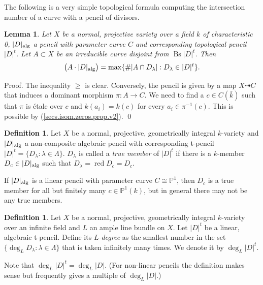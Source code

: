 \documentclass{amsart}
\newtheorem{lem}[thm]{Lemma}
\theoremstyle{definition}
\newtheorem{defn}[thm]{Definition}
\theoremstyle{remark}
\newcommand{\p}[0]{{\mathbb P}}
\newcommand{\map}[0]{\dasharrow}
\newcommand{\red}[0]{\operatorname{red}}
\newcommand{\bs}[0]{\operatorname{Bs}}
\begin{document}
\medskip

The following is a very simple topological formula computing the intersection number of a curve with a  pencil of divisors.


\begin{lem}\label{int.number.curve.pencil}
  Let  $X$ be a normal, projective variety over a  field $k$ of characteristic 0,  $|D|_{\rm alg}$  a pencil with parameter curve $C$ and corresponding topological pencil $|D|^t$. Let $A\subset X$ be an irreducible curve  disjoint from  $\bs|D|^t$. Then 
 $$
\bigl(A\cdot |D|_{\rm alg}\bigr)=\max\{\# |A\cap D_{\lambda}|:D_\lambda\in  |D|^t\}.
$$
\end{lem}

Proof.  The inequality $\geq $ is clear. 
Conversely, the pencil is given by a map  $X\map C$ that induces a dominant morphism $\pi: A\to C$.  We need to find a $c\in C(\bar k)$ such that
$\pi$ is \'etale over $c$ and $k(a_i)=k(c)$ for every
$a_i\in \pi^{-1}(c)$.  This is possible by (\ref{secs.isom.zeros.prop.v2}). \qed


\medskip

\begin{defn}\label{true.memb.defn}
Let $X$ be  a normal, projective, geometrically integral $k$-variety
and  $|D|_{\rm alg}$ a  non-composite algebraic pencil with
corresponding t-pencil  $|D|^t=\{D_{\lambda}:\lambda\in\Lambda\}$.
$D_{\lambda}$ is called a {\it true member} of  $|D|^t$
if there is a $k$-member  $D_c\in |D|_{\rm alg}$ such that $D_{\lambda}=\red D_c=D_c$. 

If $|D|_{\rm alg}$  is a linear pencil with parameter curve
 $C\cong \p^1$,  then $D_c$ is a true member for  all but finitely many  $c\in \p^1(k)$, but in general there may not be any true members.
\end{defn}



\begin{defn} Let $X$ be  a normal, projective, geometrically integral $k$-variety over  an infinite field and $L$ an ample line bundle on $X$. Let  $|D|^t$  be a linear, algebraic  t-pencil.  Define its {\it $L$-degree}  as
 the smallest number in the set $\{\deg_L D_{\lambda}: \lambda\in\Lambda\}$ that is  taken infinitely many times.
We denote it by 
$\deg_L |D|^t$.

Note that $\deg_L |D|^t=\deg_L |D|$.  (For non-linear pencils the definition makes sense but frequently gives a multiple of $\deg_L |D|$.)
\end{defn}
\end{document}
